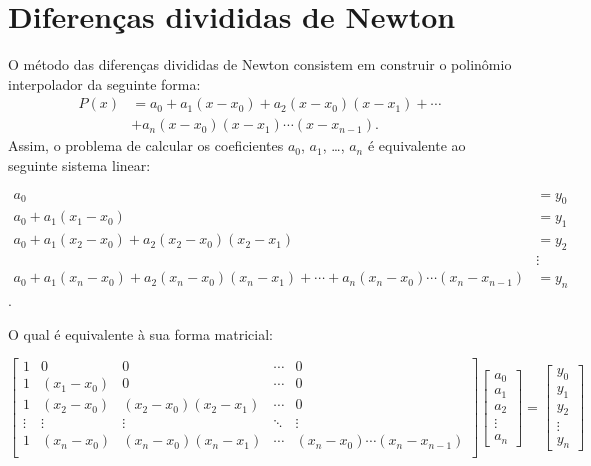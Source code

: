 \documentclass[main.tex]{subfiles}
\begin{document}
\section{Diferenças divididas de Newton}
O método das diferenças divididas de Newton consistem em construir o polinômio interpolador da seguinte forma:
\begin{align*}
P(x) &= a_0 + a_1 (x-x_0) + a_2 (x-x_0)(x-x_1) + \cdots \\
&+ a_n (x-x_0)(x-x_1)\cdots (x-x_{n-1}).
\end{align*}
Assim, o problema de calcular os coeficientes $a_0$, $a_1$, \ldots, $a_n$ é equivalente ao seguinte sistema linear:
\begin{small}
\begin{align*}
a_0 &= y_0\\
a_0+a_1(x_1-x_0) &= y_1\\
a_0+a_1(x_2-x_0)+a_2(x_2-x_0)(x_2-x_1) &= y_2\\
&\vdots\\
a_0+a_1(x_n-x_0)+a_2(x_n-x_0)(x_n-x_1)+\cdots + a_n(x_n-x_0)\cdots (x_n-x_{n-1})
 &= y_n
\end{align*}.  
\end{small}
O qual é equivalente à sua forma matricial:
\begin{small}
  \begin{equation*}
    \begin{bmatrix}
      1 & 0 & 0  & \!\cdots\!&0\\
      1& (x_1-x_0)&0 &\!\cdots\!&0\\
      1&(x_2-x_0)&(x_2-x_0)(x_2-x_1) &\!\cdots\!&0\\
      \vdots&\vdots&\vdots&\!\ddots\!&\vdots\\
      1&(x_n-x_0)&(x_n-x_0)(x_n-x_1) &\!\cdots\!& (x_{n}-x_0)\cdots(x_n-x_{n-1})\\
    \end{bmatrix}\begin{bmatrix}
      a_0\\a_1\\a_2\\ \vdots \\a_n
    \end{bmatrix} = 
    \begin{bmatrix}
      y_0\\y_1\\y_2\\ \vdots \\y_n
    \end{bmatrix}
  \end{equation*}
\end{small}
\end{document}
